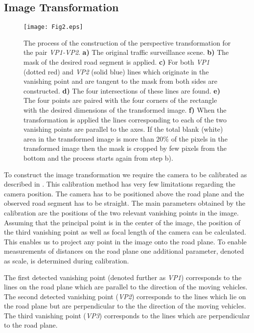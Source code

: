 \documentclass[twocolumn]{svjour3}          \smartqed  \usepackage{graphicx}
\begin{document}
\subsection{Image Transformation}
\begin{figure*}[]
   \centering
   \texttt{[image: Fig2.eps]}
   \caption{The process of the construction of the perspective transformation for the pair \textit{VP1-VP2}. \textbf{a)} The original traffic surveillance scene. \textbf{b)} The mask of the desired road segment is applied. \textbf{c)} For both \textit{VP1} (dotted red) and \textit{VP2} (solid blue) lines which originate in the vanishing point and are tangent to the mask from both sides are constructed. \textbf{d)} The four intersections of these lines are found. \textbf{e)} The four points are paired with the four corners of the rectangle with the desired dimensions of the transformed image. \textbf{f)} When the transformation is applied the lines corresponding to each of the two vanishing points are parallel to the axes. If the total blank (white) area in the transformed image is more than 20\% of the pixels in the transformed image then the mask is cropped by few pixels from the bottom and the process starts again from step b).}
   \label{fig:transformation}
\end{figure*}

To construct the image transformation we require the camera to be calibrated as described in \cite{sochor2017}. This calibration method has very few limitations regarding the camera position. The camera has to be positioned above the road plane and the observed road segment has to be straight. The main parameters obtained by the calibration are the positions of the two relevant vanishing points in the image. Assuming that the principal point is in the center of the image, the position of the third vanishing point as well as focal length of the camera can be calculated. This enables us to project any point in the image onto the road plane. To enable measurements of distances on the road plane one additional parameter, denoted as scale, is determined during calibration.

The first detected vanishing point (denoted further as \textit{VP1}) corresponds to the lines on the road plane which are parallel to the direction of the moving vehicles. The second detected vanishing point (\textit{VP2}) corresponds to the lines which lie on the road plane but are perpendicular to the the direction of the moving vehicles. The third vanishing point (\textit{VP3}) corresponds to the lines which are perpendicular to the road plane.
\end{document}
